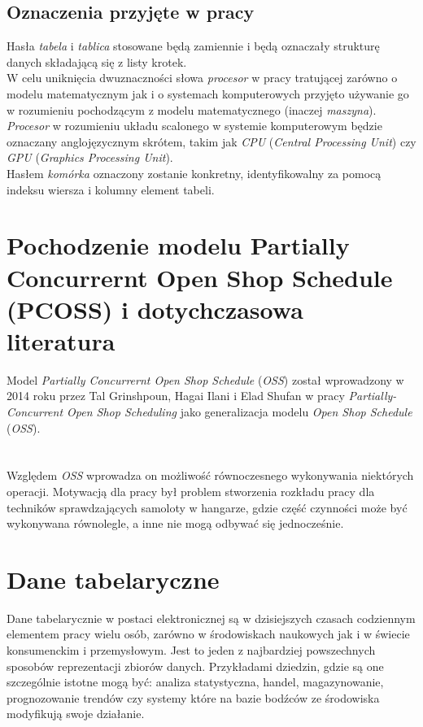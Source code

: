 \documentclass[brudnopis]{xmgr}
\begin{document}
\section{Oznaczenia przyjęte w pracy}

Hasła \emph{tabela} i \emph{tablica} stosowane będą zamiennie i będą oznaczały strukturę danych składającą się z listy krotek. 
\medskip\\

W celu uniknięcia dwuznaczności słowa \emph{procesor} w pracy tratującej zarówno o modelu matematycznym jak i o systemach komputerowych przyjęto używanie go w rozumieniu pochodzącym z modelu matematycznego (inaczej \emph{maszyna}).
\emph{Procesor} w rozumieniu układu scalonego w systemie komputerowym będzie oznaczany anglojęzycznym skrótem, takim jak \emph{CPU} (\emph{Central Processing Unit}) czy \emph{GPU} (\emph{Graphics Processing Unit}).
\medskip\\

Hasłem \emph{komórka} oznaczony zostanie konkretny, identyfikowalny za pomocą indeksu wiersza i kolumny element tabeli.

\chapter{Pochodzenie modelu Partially Concurrernt Open Shop Schedule (PCOSS) i dotychczasowa literatura}

Model \emph{Partially Concurrernt Open Shop Schedule} (\emph{OSS}) został wprowadzony w 2014 roku przez Tal Grinshpoun, Hagai Ilani i Elad Shufan w pracy \emph{Partially-Concurrent Open Shop Scheduling} \cite{PCOSS:2014:P} jako generalizacja modelu \emph{Open Shop Schedule} (\emph{OSS}). \\
\medskip\\
[tutaj o innych modelach]
\medskip\\
Względem \emph{OSS} wprowadza on możliwość równoczesnego wykonywania niektórych operacji. Motywacją dla pracy był problem stworzenia rozkładu pracy dla techników sprawdzających samoloty w hangarze, gdzie część czynności może być wykonywana równolegle, a inne nie mogą odbywać się jednocześnie. 

\chapter{Dane tabelaryczne}

Dane tabelarycznie w postaci elektronicznej są w dzisiejszych czasach codziennym elementem pracy wielu osób, zarówno w środowiskach naukowych jak i w świecie konsumenckim i przemysłowym. Jest to jeden z najbardziej powszechnych sposobów reprezentacji zbiorów danych. Przykładami dziedzin, gdzie są one szczególnie istotne mogą być: analiza statystyczna, handel, magazynowanie, prognozowanie trendów czy systemy które na bazie bodźców ze środowiska modyfikują swoje działanie.
\medskip\\
\end{document}
